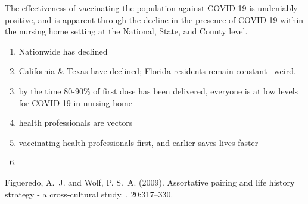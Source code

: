 \documentclass[twoside]{article}
\begin{document}
\begin{multicols}{2}
The effectiveness of vaccinating the population against COVID-19 is undeniably positive, and is apparent through the decline in the presence of COVID-19 within the nursing home setting at the National, State, and County level. 

\vspace{5mm}

\begin{enumerate}
	\item Nationwide has declined
	\item California \& Texas have declined; Florida residents remain constant-- weird.
	\item by the time 80-90\% of first dose has been delivered, everyone is at low levels for COVID-19 in nursing home
	\item health professionals are vectors
	\item vaccinating health professionals first, and earlier saves lives faster
	\item 
	
\end{enumerate} 


\begin{thebibliography}{99} %

Figueredo, A.~J. and Wolf, P. S.~A. (2009).
\newblock Assortative pairing and life history strategy - a cross-cultural
  study.
, 20:317--330.
 
\end{thebibliography}


\end{multicols}
\end{document}
